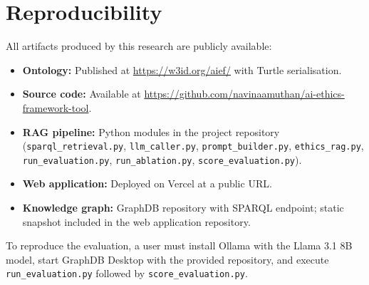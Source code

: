 \section{Reproducibility}

All artifacts produced by this research are publicly available:

\begin{itemize}
\item \textbf{Ontology:} Published at \url{https://w3id.org/aief/} with Turtle serialisation.
\item \textbf{Source code:} Available at \url{https://github.com/navinaamuthan/ai-ethics-framework-tool}.
\item \textbf{RAG pipeline:} Python modules in the project repository (\texttt{sparql\_retrieval.py}, \texttt{llm\_caller.py}, \texttt{prompt\_builder.py}, \texttt{ethics\_rag.py}, \texttt{run\_evaluation.py}, \texttt{run\_ablation.py}, \texttt{score\_evaluation.py}).
\item \textbf{Web application:} Deployed on Vercel at a public URL.
\item \textbf{Knowledge graph:} GraphDB repository with SPARQL endpoint; static snapshot included in the web application repository.
\end{itemize}

To reproduce the evaluation, a user must install Ollama with the Llama 3.1 8B model, start GraphDB Desktop with the provided repository, and execute \texttt{run\_evaluation.py} followed by \texttt{score\_evaluation.py}.
